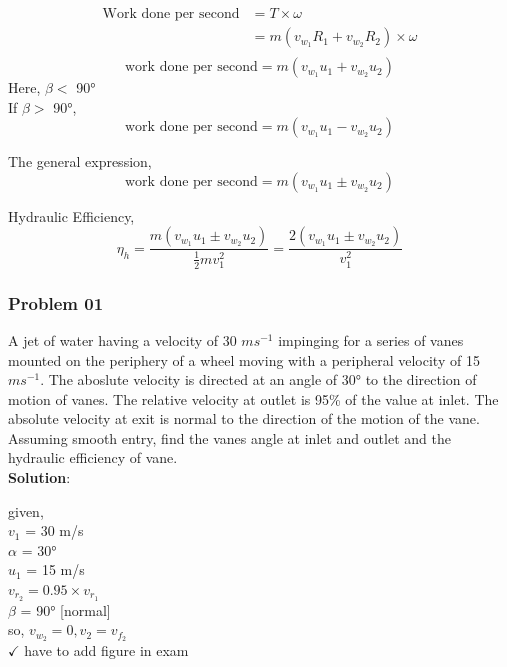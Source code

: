\documentclass{article}
\begin{document}
\begin{align*}
  \text{Work done per second} &= T \times \omega \\
  &= m \left(v_{w_1}R_1 + v_{w_2}R_2\right) \times \omega \\ 
\end{align*}
\begin{equation}
  \text{work done per second} = m \left(v_{w_1}u_1 + v_{w_2}u_2\right)  \label{eq:eq29}
\end{equation}
Here, $\beta<$  90° \\


If $\beta>$  90°,  
\begin{equation}
  \text{work done per second} = m \left(v_{w_1}u_1 - v_{w_2}u_2\right)  \label{eq:eq30}
\end{equation}

The general expression,  
\begin{equation}
  \text{work done per second} = m \left(v_{w_1}u_1 \pm v_{w_2}u_2\right)  \label{eq:eq31}
\end{equation}

Hydraulic Efficiency,
\begin{equation}
  \eta_h = \frac{m\left(v_{w_1} u_1 \pm v_{w_2} u_2\right)}{\frac{1}{2} m v_1^2} = \frac{2\left(v_{w_1} u_1 \pm v_{w_2} u_2\right)}{v_1^2}
  \label{eq:eq32}
\end{equation}

\subsubsection*{Problem 01}
A jet of water having a velocity of 30 $ms^{-1}$ impinging for a series of vanes mounted on the periphery of a wheel moving with a peripheral velocity of 15 $ms^{-1}$. The aboslute velocity is directed at an angle of 30° to the direction of motion of vanes. The relative velocity at outlet is 95\% of the value at inlet. The absolute velocity at exit is normal to the direction of the motion of the vane. Assuming smooth entry, find the vanes angle at inlet and outlet and the hydraulic efficiency of vane. \\
\textbf{Solution}: 

\begin{multicols}{2}
  given, \\
  $v_1$ = 30 m/s \\
  $\alpha$ = 30° \\
  $u_1$ = 15 m/s \\
  $v_{r_2} = 0.95 \times v_{r_1}$ \\
  $\beta$ = 90° [normal] \\
  so, $v_{w_2} = 0, v_{2} = v_{f_2}$ \\ 
  $\checkmark$ have to add figure in exam 
\end{multicols}
\end{document}
